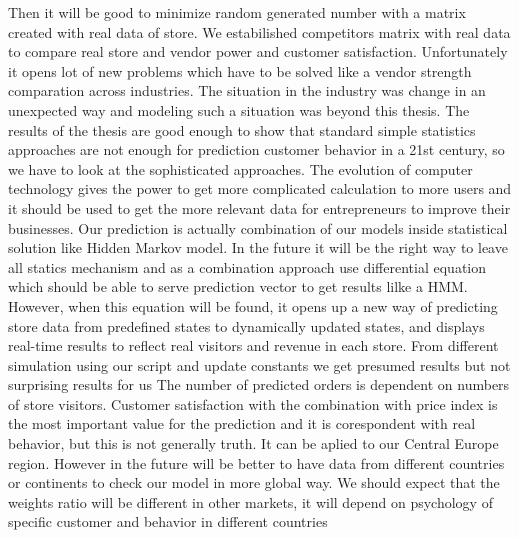 Then it will be good to minimize random generated number with a matrix created with real data of store.
We estabilished competitors matrix with real data to compare real store and vendor power and customer satisfaction.
Unfortunately it opens lot of new problems which have to be solved like a vendor strength comparation across industries.
The situation in the industry was change in an unexpected way and modeling such a situation was beyond this thesis.
The results of the thesis are good enough to show that standard simple statistics approaches are not enough for prediction
customer behavior in a 21st century, so we have to look at the sophisticated approaches.
The evolution of computer technology gives the power to get more complicated calculation to more users and it should be used
to get the more relevant data for entrepreneurs to improve their businesses.
Our prediction is actually combination of our models inside statistical solution like Hidden Markov model.
In the future it will be the right way to leave all statics mechanism and as a combination approach use differential equation
which should be able to serve prediction vector to get results lilke a HMM.
However, when this equation will be found, it opens up a new way of predicting store data from predefined states to dynamically
updated states, and displays real-time results to reflect real visitors and revenue in each store.
From different simulation using our script and update constants we get presumed results but not surprising results for us
The number of predicted orders is dependent on numbers of store visitors.
Customer satisfaction with the combination with price index is the most important value for the prediction and it is corespondent
with real behavior, but this is not generally truth.
It can be aplied to our Central Europe region.
However in the future will be better to have data from different countries or continents to check our model in more global way.
We should expect that the weights ratio will be different in other markets, it will depend on psychology of specific customer and behavior in different countries
